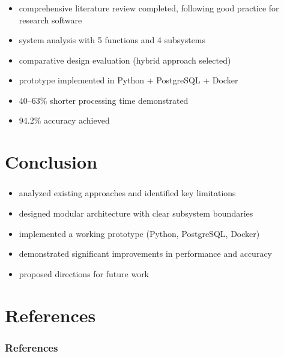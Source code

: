 \begin{frame}
  \frametitle{\insertsection}

  \begin{itemize}
    \item comprehensive literature review completed, following good practice for research software~\parencite{wilson2014best}
    \item system analysis with 5 functions and 4 subsystems
    \item comparative design evaluation (hybrid approach selected)
    \item prototype implemented in Python + PostgreSQL + Docker
    \item 40--63\% shorter processing time demonstrated
    \item 94.2\% accuracy achieved
  \end{itemize}
\end{frame}


\section{Conclusion}

\begin{frame}
  \frametitle{\insertsection}

  \begin{itemize}
    \item analyzed existing approaches and identified key limitations
    \item designed modular architecture with clear subsystem boundaries
    \item implemented a working prototype (Python, PostgreSQL, Docker)
    \item demonstrated significant improvements in performance and accuracy
    \item proposed directions for future work
  \end{itemize}
\end{frame}


\section*{References}

\begin{frame}[allowframebreaks]
  \frametitle{References}
  \printbibliography[heading=none]
\end{frame}

